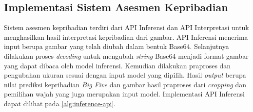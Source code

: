 \subsection{Implementasi Sistem Asesmen Kepribadian}

Sistem asesmen kepribadian terdiri dari API Inferensi dan API Interpretasi untuk menghasilkan hasil interpretasi kepribadian dari gambar. API Inferensi menerima input berupa gambar yang telah diubah dalam bentuk Base64. Selanjutnya dilakukan proses \textit{decoding} untuk mengubah \textit{string} Base64 menjadi format gambar yang dapat dibaca oleh model inferensi. Kemudian dilakukan praproses dan pengubahan ukuran sesuai dengan input model yang dipilih. Hasil \textit{output} berupa nilai prediksi kepribadian \textit{Big Five} dan gambar hasil praproses dari \textit{cropping} dan pemilihan wajah yang juga merupakan input model. Implementasi API Inferensi dapat dilihat pada \autoref{alg:inference-api}.

